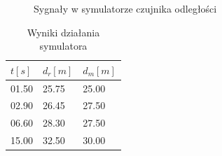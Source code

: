 \documentclass[12pt]{article}
\begin{document}
{{{\begin{figure}[H]
                    \caption{Sygnały w symulatorze czujnika odległości}
                \end{figure}
                \begin{table}[H]
                    \centering
                    \begin{tabular}{|l|l|l|}
                        \hline
                        $t[s]$ & $d_r[m]$ & $d_m[m]$ \\ \hline
                        01.50  & 25.75    & 25.00    \\ \hline
                        02.90  & 26.45    & 27.50    \\ \hline
                        06.60  & 28.30    & 27.50    \\ \hline
                        15.00  & 32.50    & 30.00    \\ \hline
                    \end{tabular}
                    \caption{Wyniki działania symulatora}
                \end{table}
            }
            \newpage

}}
\end{document}
